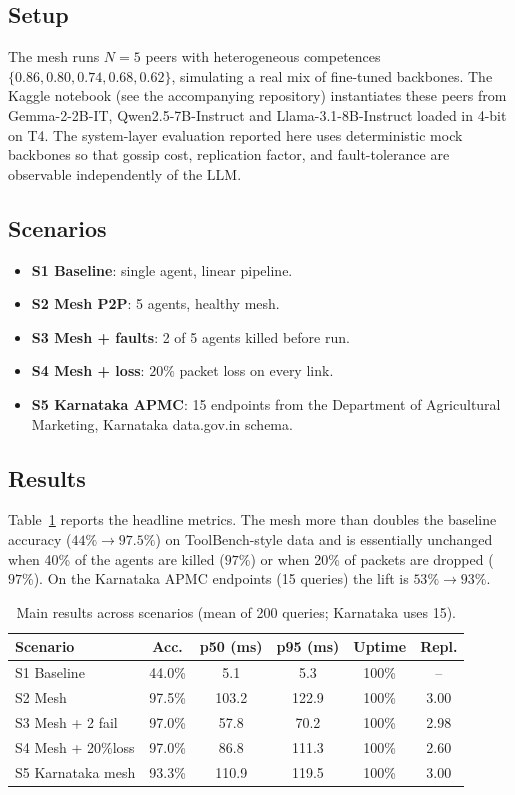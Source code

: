 \documentclass[conference]{IEEEtran}
\begin{document}
\subsection{Setup}
The mesh runs $N=5$ peers with heterogeneous competences
$\{0.86, 0.80, 0.74, 0.68, 0.62\}$, simulating a real mix of fine-tuned
backbones. The Kaggle notebook (see the accompanying repository) instantiates
these peers from Gemma-2-2B-IT, Qwen2.5-7B-Instruct and Llama-3.1-8B-Instruct
loaded in 4-bit on T4. The system-layer evaluation reported here uses
deterministic mock backbones so that gossip cost, replication factor, and
fault-tolerance are observable independently of the LLM.

\subsection{Scenarios}
\begin{itemize}
  \item \textbf{S1 Baseline}: single agent, linear pipeline.
  \item \textbf{S2 Mesh P2P}: 5 agents, healthy mesh.
  \item \textbf{S3 Mesh + faults}: 2 of 5 agents killed before run.
  \item \textbf{S4 Mesh + loss}: $20\%$ packet loss on every link.
  \item \textbf{S5 Karnataka APMC}: 15 endpoints from the
        Department of Agricultural Marketing, Karnataka data.gov.in schema.
\end{itemize}

\subsection{Results}
Table~\ref{tab:main} reports the headline metrics. The mesh more than
doubles the baseline accuracy ($44\%\!\to\!97.5\%$) on ToolBench-style data
and is essentially unchanged when 40\% of the agents are killed
($97\%$) or when 20\% of packets are dropped ($97\%$). On the Karnataka APMC
endpoints (15 queries) the lift is $53\%\!\to\!93\%$.

\begin{table}[h]
\caption{Main results across scenarios (mean of 200 queries; Karnataka uses 15).}
\label{tab:main}
\centering
\footnotesize
\begin{tabular}{lccccc}
\toprule
\textbf{Scenario} & \textbf{Acc.} & \textbf{p50 (ms)} & \textbf{p95 (ms)}
                  & \textbf{Uptime} & \textbf{Repl.} \\
\midrule
S1 Baseline       & 44.0\%  & 5.1  & 5.3   & 100\% & --  \\
S2 Mesh           & 97.5\%  & 103.2 & 122.9 & 100\% & 3.00 \\
S3 Mesh + 2 fail  & 97.0\%  & 57.8 & 70.2  & 100\% & 2.98 \\
S4 Mesh + 20\%loss & 97.0\%  & 86.8 & 111.3 & 100\% & 2.60 \\
S5 Karnataka mesh & 93.3\%  & 110.9 & 119.5 & 100\% & 3.00 \\
\bottomrule
\end{tabular}
\end{table}
\end{document}

